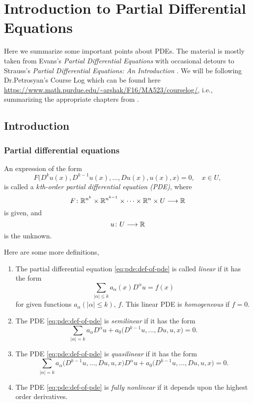 \chapter{Introduction to Partial Differential Equations}
Here we summarize some important points about PDEs. The material is mostly
taken from Evans's \emph{Partial Differential Equations} \cite{evans} with
occasional detours to Strauss's \emph{Partial Differential Equations: An
  Introduction} \cite{strauss}. We will be following Dr.\@ Petrosyan's
\textsf{Course Log} which can be found here
\url{https://www.math.purdue.edu/~arshak/F16/MA523/courselog/}, i.e.,
summarizing the appropriate chapters from \cite{evans}.

\section{Introduction}
\subsection{Partial differential equations}
\begin{definition}
  An expression of the form
  \begin{equation}
    \label{eq:pde:def-of-pde}
    F\bigl(D^ku(x),D^{k-1}u(x),\dotsc,Du(x),u(x),x\bigr)=0,
    \quad x\in U,
  \end{equation}
  is called a \emph{\(k\)th-order partial differential equation (PDE)},
  where
  \[
    F\colon\mathbb{R}^{n^k}\times\mathbb{R}^{n^{k-1}}\times\dotsb\times\mathbb{R}^n\times U\longrightarrow\mathbb{R}
  \]
  is given, and
  \[
    u\colon U\longrightarrow\mathbb{R}
  \]
  is the unknown.
\end{definition}

Here are some more definitions,
\begin{definition}
  \hfill
  \begin{enumerate}[label=(\roman*)]
  \item The partial differential equation \eqref{eq:pde:def-of-pde} is
    called \emph{linear} if it has the form
    \[
      \sum_{|\alpha|\leq k}a_\alpha(x)D^\alpha u=f(x)
    \]
    for given functions \(a_\alpha(|\alpha|\leq k)\), \(f\). This linear
    PDE is \emph{homogeneous} if \(f=0\).
  \item The PDE \eqref{eq:pde:def-of-pde} is \emph{semilinear} if it has
    the form
    \[
      \sum_{|\alpha|=k}a_\alpha D^\alpha u
      +a_0\bigl(D^{k-1}u,\dotsc,Du,u,x\bigr)=0.
    \]
  \item The PDE \eqref{eq:pde:def-of-pde} is \emph{quasilinear} if it has
    the form
    \[
      \sum_{|\alpha|=k}a_\alpha\bigl(D^{k-1}u,\dotsc,Du,u,x\bigr)D^\alpha u
      +a_0\bigl(D^{k-1}u,\dotsc,Du,u,x\bigr)=0.
    \]
  \item The PDE \eqref{eq:pde:def-of-pde} is \emph{fully nonlinear} if it
    depends upon the highest order derivatives.
  \end{enumerate}
\end{definition}

